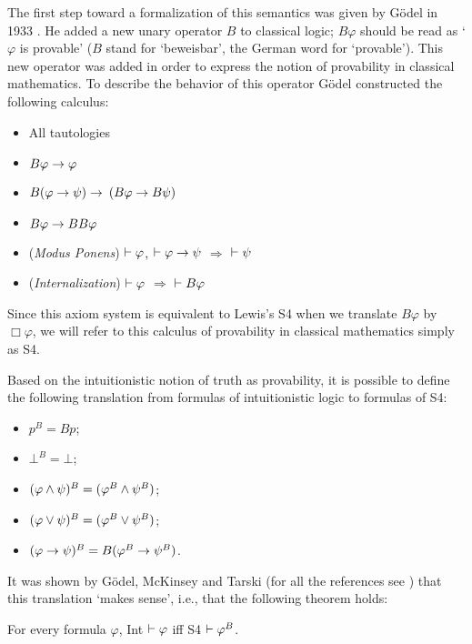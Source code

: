 \qquad The first step toward a formalization of this semantics was given by Gödel in 1933 \cite{Goedel33}. He added a new unary operator $B$ to classical logic; $B\varphi$ should be read as `$\varphi$ is provable' ($B$ stand for `beweisbar', the German word for `provable'). This new operator was added in order to express the notion of provability in classical mathematics. To describe the behavior of this operator Gödel constructed the following calculus:

\begin{itemize}
 \item[] All tautologies
 \item[] $B\varphi \rightarrow \varphi$
 \item[] $B(\varphi \rightarrow \psi) \rightarrow$ $(B\varphi \rightarrow B\psi)$
 \item[] $B\varphi \rightarrow BB\varphi$
 \item[] (\textit{Modus Ponens}) $\vdash \varphi$, $\vdash \varphi\rightarrow\psi$ $\Rightarrow$ $\vdash \psi$
 \item[] (\textit{Internalization})  $\vdash \varphi$ $\Rightarrow$ $\vdash B\varphi$
\end{itemize}



\qquad Since this axiom system is equivalent to Lewis's S4 when we translate  $B\varphi$ by  $\Box\varphi$, we will refer to this calculus of provability in classical mathematics simply as S4.



\qquad Based on the intuitionistic notion of truth as provability, it is possible to define the following translation from formulas of intuitionistic logic to formulas of S4:
\pagebreak
\begin{itemize}
	\item $p^{B} = Bp$;
	\item $\bot^{B} = \bot$;	
	\item $(\varphi \wedge \psi)^{B} = (\varphi^{B} \wedge \psi^{B})$;
	\item $(\varphi \vee \psi)^{B} = (\varphi^{B} \vee \psi^{B})$;	
	\item $(\varphi \rightarrow \psi)^{B} = B(\varphi^{B} \rightarrow \psi^{B})$.
\end{itemize}

\qquad It was shown by Gödel, McKinsey and Tarski (for all the references see \cite{Artemov06}) that this translation `makes sense', i.e., that the following theorem holds:

\begin{center}
	For every formula $\varphi$, Int $\vdash \varphi$ iff S4 $\vdash \varphi^{B}$.
\end{center}

